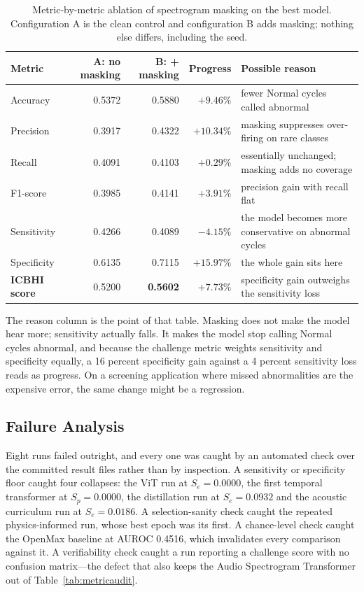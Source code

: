 \documentclass[journal,onecolumn]{IEEEtran}
\newcommand{\best}[1]{\textbf{#1}}
\begin{document}
\begin{table}[!t]
\centering
\caption{Metric-by-metric ablation of spectrogram masking on the best model. Configuration A is
the clean control and configuration B adds masking; nothing else differs, including the seed.}
\label{tab:ablationreason}
\footnotesize
\begin{tabular}{lrrrl}
\toprule
Metric & A: no masking & B: + masking & Progress & Possible reason \\
\midrule
Accuracy    & 0.5372 & 0.5880 & $+9.46\%$  & fewer Normal cycles called abnormal \\
Precision   & 0.3917 & 0.4322 & $+10.34\%$ & masking suppresses over-firing on rare classes \\
Recall      & 0.4091 & 0.4103 & $+0.29\%$  & essentially unchanged; masking adds no coverage \\
F1-score    & 0.3985 & 0.4141 & $+3.91\%$  & precision gain with recall flat \\
Sensitivity & 0.4266 & 0.4089 & $-4.15\%$  & the model becomes more conservative on abnormal cycles \\
Specificity & 0.6135 & 0.7115 & $+15.97\%$ & the whole gain sits here \\
\best{ICBHI score} & 0.5200 & \best{0.5602} & \best{$+7.73\%$} & specificity gain outweighs the sensitivity loss \\
\bottomrule
\end{tabular}
\end{table}

The reason column is the point of that table. Masking does not make the model hear more;
sensitivity actually falls. It makes the model stop calling Normal cycles abnormal, and because
the challenge metric weights sensitivity and specificity equally, a 16 percent specificity gain
against a 4 percent sensitivity loss reads as progress. On a screening application where missed
abnormalities are the expensive error, the same change might be a regression.

\subsection{Failure Analysis}
\label{subsec:failures}

Eight runs failed outright, and every one was caught by an automated check over the committed
result files rather than by inspection. A sensitivity or specificity floor caught four
collapses: the ViT run at $S_e = 0.0000$, the first temporal transformer at $S_p = 0.0000$, the
distillation run at $S_e = 0.0932$ and the acoustic curriculum run at $S_e = 0.0186$. A
selection-sanity check caught the repeated physics-informed run, whose best epoch was its
first. A chance-level check caught the OpenMax baseline at AUROC 0.4516, which invalidates every
comparison against it. A verifiability check caught a run reporting a challenge score with no
confusion matrix---the defect that also keeps the Audio Spectrogram Transformer out of
Table~\ref{tab:metricaudit}.
\end{document}
